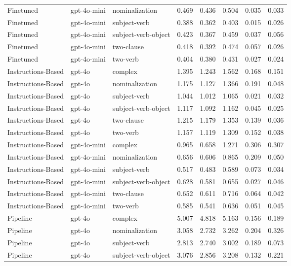 \begin{table}
\begin{tabular}{lllrrrrr}
Finetuned & gpt-4o-mini & nominalization & 0.469 & 0.436 & 0.504 & 0.035 & 0.033 \\
Finetuned & gpt-4o-mini & subject-verb & 0.388 & 0.362 & 0.403 & 0.015 & 0.026 \\
Finetuned & gpt-4o-mini & subject-verb-object & 0.423 & 0.367 & 0.459 & 0.037 & 0.056 \\
Finetuned & gpt-4o-mini & two-clause & 0.418 & 0.392 & 0.474 & 0.057 & 0.026 \\
Finetuned & gpt-4o-mini & two-verb & 0.404 & 0.380 & 0.431 & 0.027 & 0.024 \\
Instructions-Based & gpt-4o & complex & 1.395 & 1.243 & 1.562 & 0.168 & 0.151 \\
Instructions-Based & gpt-4o & nominalization & 1.175 & 1.127 & 1.366 & 0.191 & 0.048 \\
Instructions-Based & gpt-4o & subject-verb & 1.044 & 1.012 & 1.065 & 0.021 & 0.032 \\
Instructions-Based & gpt-4o & subject-verb-object & 1.117 & 1.092 & 1.162 & 0.045 & 0.025 \\
Instructions-Based & gpt-4o & two-clause & 1.215 & 1.179 & 1.353 & 0.139 & 0.036 \\
Instructions-Based & gpt-4o & two-verb & 1.157 & 1.119 & 1.309 & 0.152 & 0.038 \\
Instructions-Based & gpt-4o-mini & complex & 0.965 & 0.658 & 1.271 & 0.306 & 0.307 \\
Instructions-Based & gpt-4o-mini & nominalization & 0.656 & 0.606 & 0.865 & 0.209 & 0.050 \\
Instructions-Based & gpt-4o-mini & subject-verb & 0.517 & 0.483 & 0.589 & 0.073 & 0.034 \\
Instructions-Based & gpt-4o-mini & subject-verb-object & 0.628 & 0.581 & 0.655 & 0.027 & 0.046 \\
Instructions-Based & gpt-4o-mini & two-clause & 0.652 & 0.611 & 0.716 & 0.064 & 0.042 \\
Instructions-Based & gpt-4o-mini & two-verb & 0.585 & 0.541 & 0.636 & 0.051 & 0.045 \\
Pipeline & gpt-4o & complex & 5.007 & 4.818 & 5.163 & 0.156 & 0.189 \\
Pipeline & gpt-4o & nominalization & 3.058 & 2.732 & 3.262 & 0.204 & 0.326 \\
Pipeline & gpt-4o & subject-verb & 2.813 & 2.740 & 3.002 & 0.189 & 0.073 \\
Pipeline & gpt-4o & subject-verb-object & 3.076 & 2.856 & 3.208 & 0.132 & 0.221 \\

\end{tabular}
\end{table}
